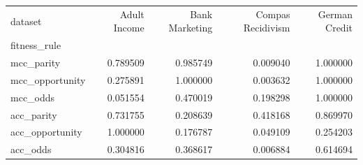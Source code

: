 \begin{tabular}{lrrrr}
\toprule
dataset & Adult Income & Bank Marketing & Compas Recidivism & German Credit \\
fitness_rule &  &  &  &  \\
\midrule
mcc_parity & 0.789509 & 0.985749 & 0.009040 & 1.000000 \\
mcc_opportunity & 0.275891 & 1.000000 & 0.003632 & 1.000000 \\
mcc_odds & 0.051554 & 0.470019 & 0.198298 & 1.000000 \\
acc_parity & 0.731755 & 0.208639 & 0.418168 & 0.869970 \\
acc_opportunity & 1.000000 & 0.176787 & 0.049109 & 0.254203 \\
acc_odds & 0.304816 & 0.368617 & 0.006884 & 0.614694 \\
\bottomrule
\end{tabular}
